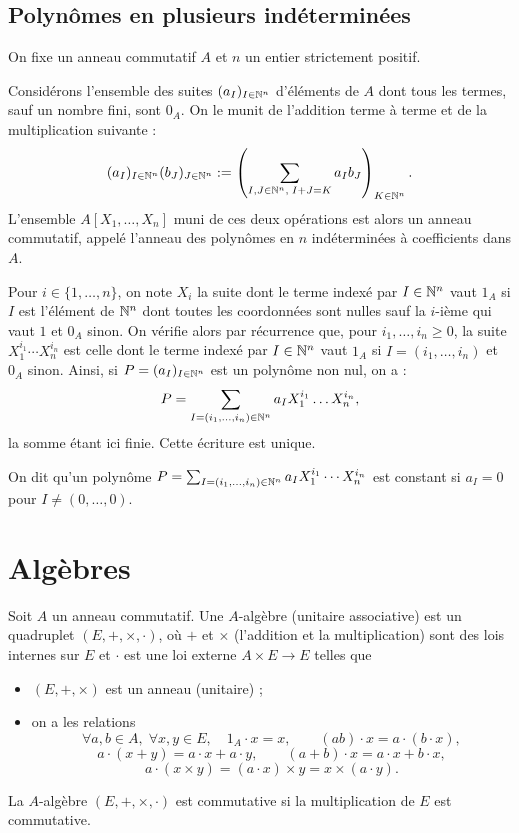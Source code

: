 \documentclass[]{report}
\begin{document}
\subsection{Polynômes en plusieurs indéterminées}

On fixe un anneau commutatif $A$ et $n$ un entier strictement positif.

\begin{df}{}{}
    Considérons l'ensemble des suites $(a_I)_{I \in \mathbb{N}^n}$ d'éléments de $A$ dont tous les termes, sauf un nombre fini, sont $0_A$. On le munit de l'addition terme à terme et de la multiplication suivante :
    \[(a_I)_{I \in \mathbb{N}^n} (b_J)_{J \in \mathbb{N}^n} := \left(\sum_{I, J \in \mathbb{N}^n, \; I + J = K} a_I b_J\right)_{K \in \mathbb{N}^n}.\]
    L'ensemble $A[X_1, \ldots, X_n]$ muni de ces deux opérations est alors un anneau commutatif, appelé l'anneau des polynômes en $n$ indéterminées à coefficients dans $A$.

    Pour $i \in \{1, \ldots, n\}$, on note $X_i$ la suite dont le terme indexé par $I \in \mathbb{N}^n$ vaut $1_A$ si $I$ est l'élément de $\mathbb{N}^n$ dont toutes les coordonnées sont nulles sauf la $i$-ième qui vaut $1$ et $0_A$ sinon. On vérifie alors par récurrence que, pour $i_1, \ldots, i_n \ge 0$, la suite $X_1^{i_1} \cdots X_n^{i_n}$ est celle dont le terme indexé par $I \in \mathbb{N}^n$ vaut $1_A$ si $I = (i_1, \ldots, i_n)$ et $0_A$ sinon. Ainsi, si $P = (a_I)_{I \in \mathbb{N}^n}$ est un polynôme non nul, on a :
    \[P = \sum_{I = (i_1, \dots, i_n) \in \mathbb{N}^n} a_I X_1^{i_1} \dots X_n^{i_n},\]
    la somme étant ici finie. Cette écriture est unique.

    On dit qu'un polynôme $P = \sum_{I = (i_1, \ldots, i_n) \in \mathbb{N}^n} a_I X_1^{i_1} \cdots X_n^{i_n}$ est constant si $a_I = 0$ pour $I \neq (0, \ldots, 0)$.
\end{df}

\section{Algèbres}

\begin{df}{}{}
    Soit $A$ un anneau commutatif. Une $A$-algèbre (unitaire associative) est un quadruplet $(E, +, \times, \cdot)$, où $+$ et $\times$ (l'addition et la multiplication) sont des lois internes sur $E$ et $\cdot$ est une loi externe $A \times E \rightarrow E$ telles que
    \begin{itemize}
        \item $(E, +, \times)$ est un anneau (unitaire) ;
        \item on a les relations
        \[\forall a, b \in A, \; \forall x, y \in E, \quad 1_A \cdot x = x, \qquad (ab) \cdot x = a \cdot (b \cdot x),\]
        \[a \cdot (x + y) = a \cdot x + a \cdot y, \qquad (a + b) \cdot x = a \cdot x + b \cdot x,\]
        \[a \cdot (x \times y) = (a \cdot x) \times y = x \times (a \cdot y).\]
    \end{itemize}
    La $A$-algèbre $(E, +, \times, \cdot)$ est commutative si la multiplication de $E$ est commutative.
\end{df}
\end{document}
